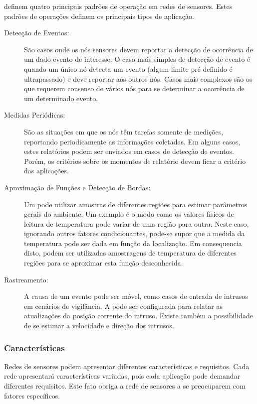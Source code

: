 \cite{Holger2005} definem quatro principais padrões de operação em redes de sensores. Estes padrões de operações definem os principais tipos de aplicação.

\begin{description}

\item[Detecção de Eventos:] São casos onde os nós sensores devem reportar a detecção de ocorrência de um dado evento de interesse. O caso mais simples de detecção de evento é quando um único nó detecta um evento (algum limite pré-definido é ultrapassado) e deve reportar aos outros nós. Casos mais complexos são os que requerem consenso de vários nós para se determinar a ocorrência de um determinado evento.

\item[Medidas Periódicas: ] São as situações em que os nós têm tarefas somente de medições, reportando periodicamente as informações coletadas. Em alguns casos, estes relatórios podem ser enviados em casos de detecção de eventos. Porém, os critérios sobre os momentos de relatório devem ficar a critério das aplicações.

\item[Aproximação de Funções e Detecção de Bordas:] Um \rssf pode utilizar amostras de diferentes regiões para estimar parâmetros gerais do ambiente. Um exemplo é o modo como os valores físicos de leitura de temperatura pode variar de uma região para outra. Neste caso, ignorando outros fatores condicionantes, pode-se supor que a medida da temperatura pode ser dada em função da localização. Em consequencia disto, podem ser utilizadas amostragens de temperatura de diferentes regiões para se aproximar esta função desconhecida.

\item[Rastreamento:] A causa de um evento pode ser móvel, como casos de entrada de intrusos em cenários de vigilância. A \rssf pode ser configurada para relatar as atualizações da posição corrente do intruso. Existe também a possibilidade de se estimar a velocidade e direção dos intrusos. 

\end{description}



\subsubsection{Características}
Redes de sensores podem apresentar diferentes características e requisitos. Cada rede apresentará características variadas, pois cada aplicação pode demandar diferentes requisitos.
Este fato obriga a rede de sensores a se preocuparem com fatores específicos.

